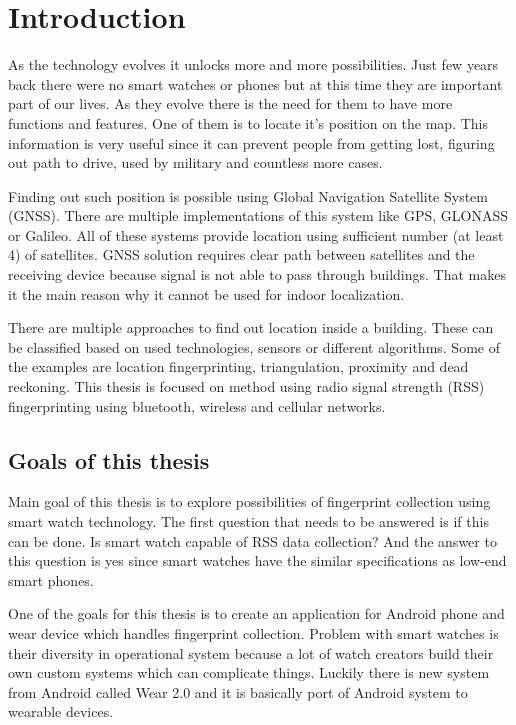 \chapter{Introduction}\label{sec:Introduction}
\setcounter{page}{1}
As the technology evolves it unlocks more and more possibilities. Just few years back there were no smart watches or phones but at this time they are important part of our lives. As they evolve there is the need for them to have more functions and features. One of them is to locate it's position on the map. This information is very useful since it can prevent people from getting lost, figuring out path to drive, used by military and countless more cases.

Finding out such position is possible using Global Navigation Satellite System (GNSS). There are multiple implementations of this system like GPS, GLONASS or Galileo. All of these systems provide location using sufficient number (at least 4) of satellites.\cite{GNSS} GNSS solution requires clear path between satellites and the receiving device because signal is not able to pass through buildings. That makes it the main reason why it cannot be used for indoor localization.

There are multiple approaches to find out location inside a building. These can be classified based on used technologies, sensors or different algorithms. Some of the examples are location fingerprinting, triangulation, proximity and dead reckoning.\cite{AaPLocalisation} This thesis is focused on method using radio signal strength (RSS) fingerprinting using bluetooth, wireless and cellular networks. 

\section{Goals of this thesis}\label{sec:GoalsOfThisThesis}
Main goal of this thesis is to explore possibilities of fingerprint collection using smart watch technology. The first question that needs to be answered is if this can be done. Is smart watch capable of RSS data collection? And the answer to this question is yes since smart watches have the similar specifications as low-end smart phones. 

One of the goals for this thesis is to create an application for Android phone and wear device which handles fingerprint collection. Problem with smart watches is their diversity in operational system because a lot of watch creators build their own custom systems which can complicate things. Luckily there is new system from Android called Wear 2.0 and it is basically port of Android system to wearable devices. 

